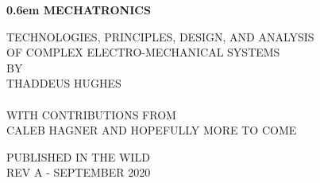 




\clearpage
\newcommand\nbvspace[1][3]{\vspace*{\stretch{#1}}}
\newcommand\nbstretchyspace{\spaceskip0.5em plus 0.25em minus 0.25em}
\newcommand{\nbtitlestretch}{\spaceskip0.6em}
\pagestyle{plain}
\begin{center}
  \bfseries
  \nbvspace[1]
  \Huge
  {\nbtitlestretch\huge
    MECHATRONICS}

  \nbvspace[1]
  \normalsize
  TECHNOLOGIES, PRINCIPLES, DESIGN, AND ANALYSIS\\
  OF COMPLEX ELECTRO-MECHANICAL SYSTEMS\\
  
  \nbvspace[1]
  \small BY\\
  \Large THADDEUS HUGHES\\
  \ \\
  \tiny WITH CONTRIBUTIONS FROM\\
  \small CALEB HAGNER
  \small AND HOPEFULLY MORE TO COME

  \nbvspace[2]

  \nbvspace[3]
  \normalsize

  \large
  PUBLISHED IN THE WILD \\
  \small REV A - SEPTEMBER 2020 \\
\end{center}

\ifdefined\isbook

  \raggedbottom

  \tableofcontents
\fi







\ifdefined\isbook
  \printindex
\fi


